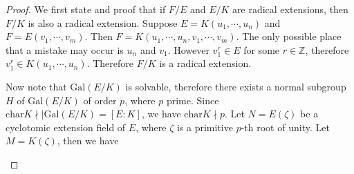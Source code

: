 \begin{proof}
We first state and proof that if $F/E$ and $E/K$ are radical extensions, then $F/K$ is also a radical extension. Suppose $E=K(u_1,\cdots,u_n)$ and $F=E(v_1,\cdots,v_m)$. Then $F=K(u_1,\cdots,u_n,v_1,\cdots,v_m)$. The only possible place that a mistake may occur is $u_n$ and $v_1$. However $v_1^r\in E$ for some $r\in\mathbb{Z}$, therefore $v_1^r\in K(u_1,\cdots,u_n)$. Therefore $F/K$ is a radical extension.\par
Now note that $\mathrm{Gal}(E/K)$ is solvable, therefore there exists a normal subgroup $H$ of $\mathrm{Gal}(E/K)$ of order $p$, where $p$ prime. Since $\mathrm{char}K\nmid |\mathrm{Gal}(E/K)=[E:K]$, we have $\mathrm{char}K\nmid p$. Let $N=E(\zeta)$ be a cyclotomic extension field of $E$, where $\zeta$ is a primitive $p$-th root of unity. Let $M=K(\zeta)$, then we have 
\begin{center}



\end{center}
\end{proof}
